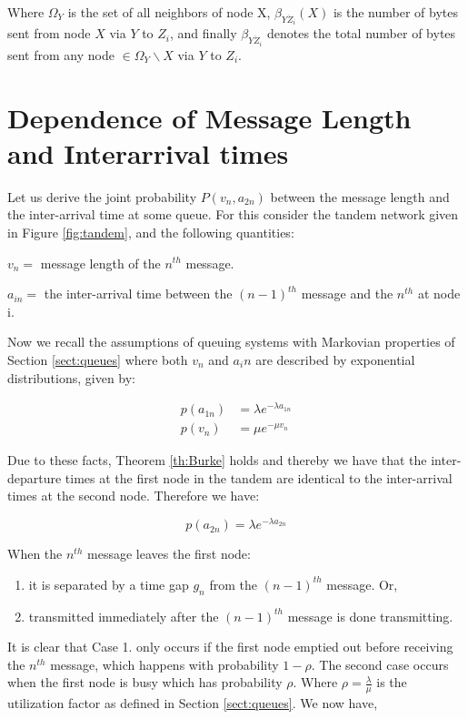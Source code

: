 Where $\Omega_{Y}$ is the set of all neighbors of node X,  $\beta_{\overline{YZ_{i}}} (X)$ is the number of bytes sent from node $X$ via $Y$ to $Z_{i}$, and finally $\beta_{\overline{YZ_{i}}}$ denotes the total number of bytes sent from any node $\in  \Omega_{Y} \backslash X$ via $Y$ to $Z_{i}$.
\section{Dependence of Message Length and Interarrival times}
\label{sect:KLEDEP}

Let us derive the joint probability $P(v_n,a_{2n})$ between the message length and the inter-arrival time at some queue. For this consider the tandem network given in Figure \ref{fig:tandem}, and the following quantities:

$v_n = $ message length of the $n^{th}$ message.

$a_{in} = $ the inter-arrival time between the $(n-1)^{th}$ message and the $n^{th}$ at node i.

Now we recall the assumptions of queuing systems with Markovian properties of Section \ref{sect:queues} where both $v_n$ and $a_in$ are described by exponential distributions, given by:

\begin{align}
\label{eq:inter1}
p(a_{1n}) & = \lambda e^{-\lambda a_{1n}}\\
p(v_n) & = \mu e^{-\mu v_n}
\label{eq:msglen}
\end{align}


Due to these facts, Theorem \ref{th:Burke} holds and thereby we have that the inter-departure times at the first node in the tandem are identical to the inter-arrival times at the second node. Therefore we have:

\begin{equation}
p(a_{2n}) = \lambda e^{-\lambda a_{2n}}
\label{eq:inter2}
\end{equation}
 
When the $n^{th}$ message leaves the first node:

\begin{enumerate}
 \item it is separated by a time gap $g_n$ from the $(n-1)^{th}$ message. Or,
 \item transmitted immediately after the $(n-1)^{th}$ message is done transmitting.
\end{enumerate}

It is clear that Case 1. only occurs if the first node emptied out before receiving the $n^{th}$ message, which happens with probability $1-\rho$. The second case occurs when the first node is busy which has probability $\rho$. Where $\rho = \frac{\lambda}{\mu}$ is the utilization factor as defined in Section \ref{sect:queues}. We now have,

